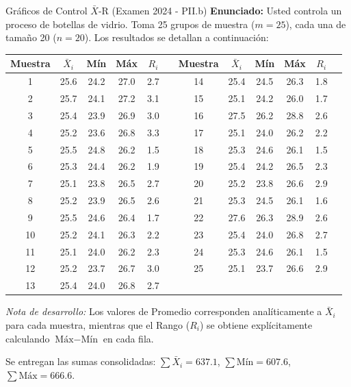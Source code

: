 \vspace{0.4cm}
\begin{ejercicio}{Gráficos de Control $\bar{X}$-R (Examen 2024 - PII.b)}
\textbf{Enunciado:} Usted controla un proceso de botellas de vidrio. Toma 25 grupos de muestra ($m=25$), cada una de tamaño 20 ($n=20$). Los resultados se detallan a continuación:

\begin{center}
\scriptsize
\begin{tabular}{cccccc|cccccc}
\toprule
\textbf{Muestra} & \textbf{$\bar{X}_i$} & \textbf{Mín} & \textbf{Máx} & \textbf{$R_i$} & & \textbf{Muestra} & \textbf{$\bar{X}_i$} & \textbf{Mín} & \textbf{Máx} & \textbf{$R_i$} \\
\midrule
1 & 25.6 & 24.2 & 27.0 & 2.7 & & 14 & 25.4 & 24.5 & 26.3 & 1.8 \\
2 & 25.7 & 24.1 & 27.2 & 3.1 & & 15 & 25.1 & 24.2 & 26.0 & 1.7 \\
3 & 25.4 & 23.9 & 26.9 & 3.0 & & 16 & 27.5 & 26.2 & 28.8 & 2.6 \\
4 & 25.2 & 23.6 & 26.8 & 3.3 & & 17 & 25.1 & 24.0 & 26.2 & 2.2 \\
5 & 25.5 & 24.8 & 26.2 & 1.5 & & 18 & 25.3 & 24.6 & 26.1 & 1.5 \\
6 & 25.3 & 24.4 & 26.2 & 1.9 & & 19 & 25.4 & 24.2 & 26.5 & 2.3 \\
7 & 25.1 & 23.8 & 26.5 & 2.7 & & 20 & 25.2 & 23.8 & 26.6 & 2.9 \\
8 & 25.2 & 23.9 & 26.5 & 2.6 & & 21 & 25.3 & 24.5 & 26.1 & 1.6 \\
9 & 25.5 & 24.6 & 26.4 & 1.7 & & 22 & 27.6 & 26.3 & 28.9 & 2.6 \\
10 & 25.2 & 24.1 & 26.3 & 2.2 & & 23 & 25.4 & 24.0 & 26.8 & 2.7 \\
11 & 25.1 & 24.0 & 26.2 & 2.3 & & 24 & 25.3 & 24.6 & 26.1 & 1.5 \\
12 & 25.2 & 23.7 & 26.7 & 3.0 & & 25 & 25.1 & 23.7 & 26.6 & 2.9 \\
13 & 25.4 & 24.0 & 26.8 & 2.7 & & & & & & \\
\bottomrule
\end{tabular}
\end{center}

\textit{Nota de desarrollo:} Los valores de Promedio corresponden analíticamente a $\bar{X}_i$ para cada muestra, mientras que el Rango ($R_i$) se obtiene explícitamente calculando $\text{Máx} - \text{Mín}$ en cada fila.

Se entregan las sumas consolidadas: $\sum \bar{X}_i = 637.1$, $\sum \text{Mín} = 607.6$, $\sum \text{Máx} = 666.6$.


\end{ejercicio}
